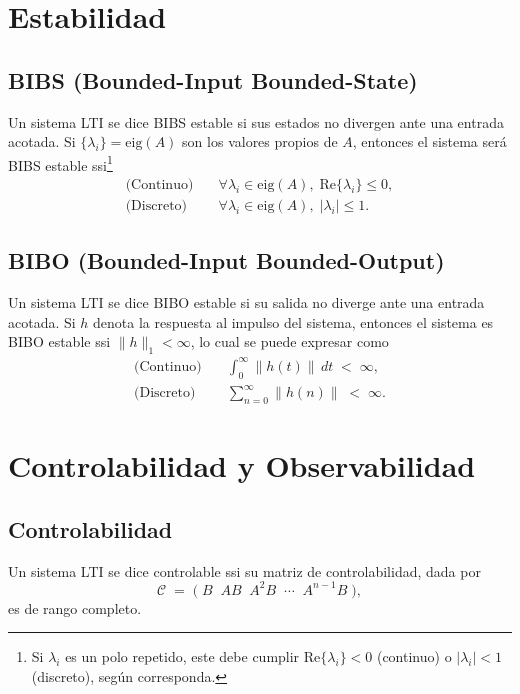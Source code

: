 \documentclass[
  11pt,
  letterpaper,
   addpoints,
  answers
  ]{exam}
\begin{document}
\section*{Estabilidad}

\subsection*{BIBS (Bounded-Input Bounded-State)}
Un sistema LTI se dice BIBS estable si sus estados no divergen ante una entrada acotada. Si $\{\lambda_i\}=\mathrm{eig}(A)$ son los valores propios de $A$, entonces el sistema será BIBS estable ssi\footnote{Si $\lambda_i$ es un polo repetido, este debe cumplir $\mathrm{Re}\{\lambda_i\}<0$ (continuo) o $|\lambda_i|<1$ (discreto), según corresponda.}
\begin{align}
  \text{(Continuo)}\quad &\forall \lambda_i\in\mathrm{eig}(A),\; \mathrm{Re}\{\lambda_i\}\le 0,\\
  \text{(Discreto)}\quad &\forall \lambda_i\in\mathrm{eig}(A),\; |\lambda_i|\le 1.
\end{align}

\subsection*{BIBO (Bounded-Input Bounded-Output)}
Un sistema LTI se dice BIBO estable si su salida no diverge ante una entrada acotada. Si $h$ denota la respuesta al impulso del sistema, entonces el sistema es BIBO estable ssi $\|h\|_1<\infty$, lo cual se puede expresar como
\begin{align}
  \text{(Continuo)}\quad &\int_{0}^{\infty} \|h(t)\|\,dt \;<\;\infty,\\
  \text{(Discreto)}\quad &\sum_{n=0}^{\infty} \|h(n)\| \;<\;\infty.
\end{align}

\section*{Controlabilidad y Observabilidad}

\subsection*{Controlabilidad}
Un sistema LTI se dice controlable ssi su matriz de controlabilidad, dada por
\begin{equation}
  \mathcal{C} \;=\; \big( \; B \;\; AB \;\; A^2 B \;\; \cdots \;\; A^{n-1}B \; \big),
\end{equation}
es de rango completo.
\end{document}
